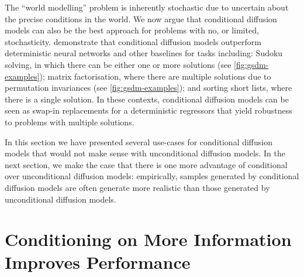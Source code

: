 The ``world modelling'' problem is inherently stochastic due to uncertain about the precise conditions in the world. We now argue that conditional diffusion models can also be the best approach for problems with no, or limited, stochasticity. \citet{weilbach2023graphically,weilbach2023scaling} demonstrate that conditional diffusion models outperform deterministic neural networks and other baselines for tasks including: Sudoku solving, in which there can be either one or more solutions (see \cref{fig:gsdm-examples}); matrix factorisation, where there are multiple solutions due to permutation invariances (see \cref{fig:gsdm-examples}); and sorting short lists, where there is a single solution. In these contexts, conditional diffusion models can be seen as swap-in replacements for a deterministic regressors that yield robustness to problems with multiple solutions.

In this section we have presented several use-cases for conditional diffusion models that would not make sense with unconditional diffusion models. In the next section, we make the case that there is one more advantage of conditional over unconditional diffusion models: empirically, samples generated by conditional diffusion models are often generate more realistic than those generated by unconditional diffusion models.

\section{Conditioning on More Information Improves Performance} \label{sec:conditioning-on-more-improves-performance}

